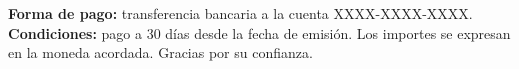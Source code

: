 \documentclass[11pt,a4paper]{article}
\begin{document}
\vspace{2em}

{\small
\textbf{Forma de pago:} transferencia bancaria a la cuenta XXXX-XXXX-XXXX.\\
\textbf{Condiciones:} pago a 30 días desde la fecha de emisión. Los importes
se expresan en la moneda acordada. Gracias por su confianza.}
\end{document}
